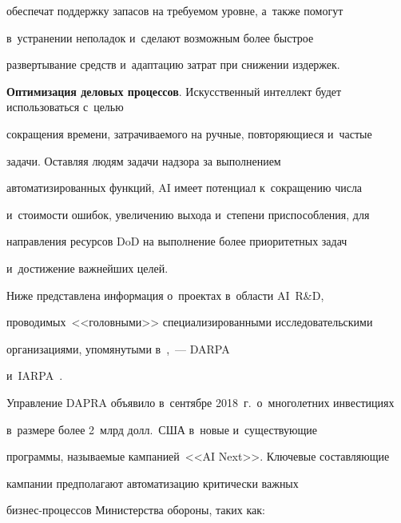 \begin{description}
обеспечат поддержку запасов на тре\-бу\-емом уровне, а~так\-же помогут


в~устранении неполадок и~сделают возможным более быст\-рое


развертывание средств и~адап\-та\-цию затрат при снижении издержек.


\item[\,]


  \textbf{Оптимизация деловых процессов}. Искусственный интеллект будет использоваться с~\mbox{целью}


сокращения времени, затрачиваемого на ручные, повторяющиеся и~час\-тые


задачи. Оставляя людям задачи надзора за выполнением


автоматизированных функций, AI имеет потенциал к~сокращению чис\-ла


и~стоимости ошибок, увеличению выхода и~степени приспособления, для


направления ресурсов DoD на выполнение более приоритетных задач


и~достижение важнейших целей.


\end{description}





  Ниже представлена информация о~проектах в~области AI~R\&D,


проводимых~<<головными>> специализированными исследовательскими


организациями, упомянутыми в~\cite{13-bor},~--- DARPA~\cite{14-bor}


и~\mbox{IARPA}~\cite{15-bor}.





  Управление DAPRA объявило в~сентябре 2018~г.\ о~многолетних инвестициях


в~размере более 2~млрд долл.\ США в~новые и~существующие


программы, на\-зы\-ва\-емые кампанией~<<AI Next>>. Ключевые составляющие


кампании предполагают автоматизацию критически важных


биз\-нес-про\-цес\-сов Министерства обороны, таких как:


